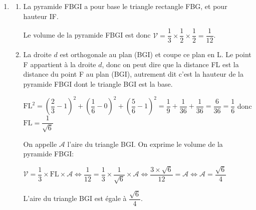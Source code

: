 \documentclass[10pt]{article}
\begin{document}
\begin{enumerate}
\begin{enumerate}

Le point L est donc le point d'intersection de la droite $d$ et du plan (BGI).
\end{enumerate}

\item 


\begin{enumerate}
\item La pyramide FBGI a pour base le triangle rectangle FBG, et pour hauteur IF.


Le volume de la pyramide FBGI est donc $\mathcal{V}=\dfrac{1}{3}\times \dfrac{1}{2}\times \dfrac{1}{2} =\dfrac{1}{12}$.

\item 
La droite $d$ est orthogonale au plan (BGI) et coupe ce plan en L. Le point F appartient à la droite $d$, donc on peut dire que la distance FL est la distance du point F au plan (BGI), autrement dit c'est la hauteur de la pyramide FBGI dont le triangle BGI est la base.

$\text{FL}^2 = \left (\dfrac{2}{3} -1\right )^2 + \left (\dfrac{1}{6}-0 \right )^2 + \left (\dfrac{5}{6} -1\right )^2
= \dfrac{1}{9} + \dfrac{1}{36} + \dfrac{1}{36} = \dfrac{6}{36} = \dfrac{1}{6}$
donc
$\text{FL} = \dfrac{1}{\sqrt{6}}$

On appelle $\mathcal{A}$ l'aire du triangle BGI.
On exprime le volume de la pyramide FBGI:

$\mathcal{V} = \dfrac{1}{3}\times \text{FL}\times \mathcal{A}
\iff
\dfrac{1}{12} = \dfrac{1}{3}\times \dfrac{1}{\sqrt{6}} \times \mathcal{A}
\iff
\dfrac{3\times \sqrt{6}}{12} = \mathcal{A}
\iff
\mathcal{A} = \dfrac{\sqrt{6}}{4}$

L'aire du triangle BGI est égale à $ \dfrac{\sqrt{6}}{4}$.

\end{enumerate}

\end{enumerate}

\bigskip
\end{document}
